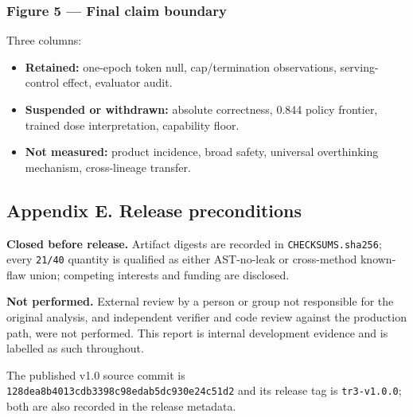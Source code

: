 \documentclass[
]{article}
\providecommand{\tightlist}{%
  \setlength{\itemsep}{0pt}\setlength{\parskip}{0pt}}
\begin{document}
\subsubsection{Figure 5 --- Final claim
boundary}\label{figure-5--final-claim-boundary}

Three columns:

\begin{itemize}
\tightlist
\item
  \textbf{Retained:} one-epoch token null, cap/termination observations,
  serving-control effect, evaluator audit.
\item
  \textbf{Suspended or withdrawn:} absolute correctness, 0.844 policy
  frontier, trained dose interpretation, capability floor.
\item
  \textbf{Not measured:} product incidence, broad safety, universal
  overthinking mechanism, cross-lineage transfer.
\end{itemize}

\subsection{Appendix E. Release
preconditions}\label{appendix-e-release-preconditions}

\textbf{Closed before release.} Artifact digests are recorded in
\texttt{CHECKSUMS.sha256}; every \texttt{21/40} quantity is qualified as
either AST-no-leak or cross-method known-flaw union; competing interests
and funding are disclosed.

\textbf{Not performed.} External review by a person or group not
responsible for the original analysis, and independent verifier and code
review against the production path, were not performed. This report is
internal development evidence and is labelled as such throughout.

The published v1.0 source commit is
\texttt{128dea8b4013cdb3398c98edab5dc930e24c51d2} and its release tag is
\texttt{tr3-v1.0.0}; both are also recorded in the release metadata.
\end{document}

